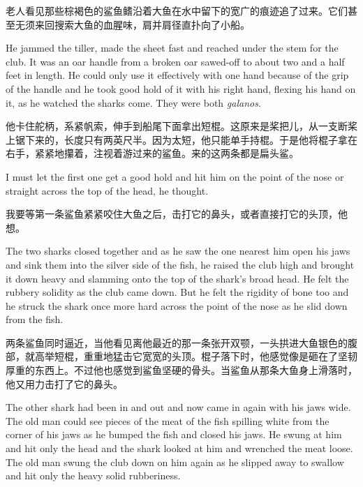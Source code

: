\begin{paracol}{2}
老人看见那些棕褐色的鲨鱼鳍沿着大鱼在水中留下的宽广的痕迹追了过来。它们甚至无须来回搜索大鱼的血腥味，肩并肩径直扑向了小船。

\switchcolumn*

He jammed the tiller, made the sheet fast and reached under the stem for the
club. It was an oar handle from a broken oar \gls{sawed-off} to about two
and a half feet in length. He could only use it \gls{effectively} with one
hand because of the \gls{grip} of the handle and he took good hold of it with his
right hand, \gls{flexing} his hand on it, as he watched the sharks come.
They were both \emph{galanos}.

\switchcolumn

他卡住舵柄，系紧帆索，伸手到船尾下面拿出短棍。这原来是桨把儿，从一支断桨上锯下来的，长度只有两英尺半。因为太短，他只能单手持棍。于是他将棍子拿在右手，紧紧地攥着，注视着游过来的鲨鱼。来的这两条都是扁头鲨。

\switchcolumn*

I must let the first one get a good hold and hit him on the point of the
nose or straight across the top of the head, he thought.

\switchcolumn

我要等第一条鲨鱼紧紧咬住大鱼之后，击打它的鼻头，或者直接打它的头顶，他想。

\switchcolumn*

The two sharks closed together and as he saw the one nearest him open his
jaws and \gls{sink} them into the silver side of the fish, he raised the club high
and brought it down heavy and \gls{slamming} onto the top of the shark's
broad head. He felt the \gls{rubbery} \gls{solidity} as the club came down.
But he felt the \gls{rigidity} of bone too and he struck the shark once more
hard across the point of the nose as he slid down from the fish.

\switchcolumn

两条鲨鱼同时逼近，当他看见离他最近的那一条张开双颚，一头拱进大鱼银色的腹部，就高举短棍，重重地猛击它宽宽的头顶。棍子落下时，他感觉像是砸在了坚韧厚重的东西上。不过他也感觉到鲨鱼坚硬的骨头。当鲨鱼从那条大鱼身上滑落时，他又用力击打了它的鼻头。

\switchcolumn*

The other shark had been in and out and now came in again with his jaws
wide. The old man could see pieces of the meat of the fish \gls{spilling}
white from the corner of his jaws as he bumped the fish and closed his jaws.
He swung at him and hit only the head and the shark looked at him and
\gls{wrenched} the meat loose. The old man swung the club down on him again as he
slipped away to swallow and hit only the heavy solid \gls{rubberiness}.


\end{paracol}

